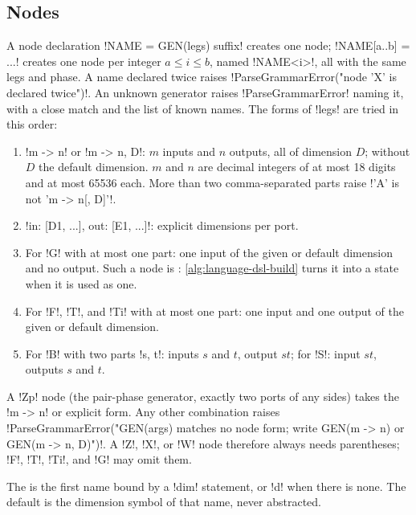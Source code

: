 \subsection{Nodes}\label{sec:language-dsl-nodes}

A node declaration \code!NAME = GEN(legs) suffix! creates one node; \code!NAME[a..b] = ...! creates one node per integer $a\le i\le b$, named \code!NAME<i>!, all with the same legs and phase. A name declared twice raises \code!ParseGrammarError("node 'X' is declared twice")!. An unknown generator raises \py!ParseGrammarError! naming it, with a close match and the list of known names. The forms of \code!legs! are tried in this order:

\begin{enumerate}
\item \code!m -> n! or \code!m -> n, D!: $m$ inputs and $n$ outputs, all of dimension $D$; without $D$ the default dimension. $m$ and $n$ are decimal integers of at most 18 digits and at most 65536 each. More than two comma-separated parts raise \code!'A' is not 'm -> n[, D]'!.
\item \code!in: [D1, ...], out: [E1, ...]!: explicit dimensions per port.
\item For \code!G! with at most one part: one input of the given or default dimension and no output. Such a node is : \cref{alg:language-dsl-build} turns it into a state when it is used as one.
\item For \code!F!, \code!T!, and \code!Ti! with at most one part: one input and one output of the given or default dimension.
\item For \code!B! with two parts \code!s, t!: inputs $s$ and $t$, output $st$; for \code!S!: input $st$, outputs $s$ and $t$.
\end{enumerate}
A \code!Zp! node (the pair-phase generator, exactly two ports of any sides) takes the \code!m -> n! or explicit form. Any other combination raises \code!ParseGrammarError("GEN(args) matches no node form; write GEN(m -> n) or GEN(m -> n, D)")!. A \code!Z!, \code!X!, or \code!W! node therefore always needs parentheses; \code!F!, \code!T!, \code!Ti!, and \code!G! may omit them.

The  is the first name bound by a \code!dim! statement, or \code!d! when there is none. The default is the dimension symbol of that name, never abstracted.

